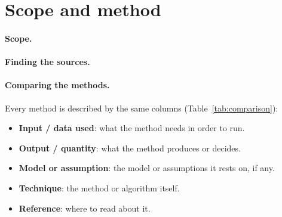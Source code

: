 \section{Scope and method}
\label{sec:method}

\paragraph{Scope.}

\paragraph{Finding the sources.}

\paragraph{Comparing the methods.}
Every method is described by the same columns (Table~\ref{tab:comparison}):

\begin{itemize}
  \item \textbf{Input / data used}: what the method needs in order to run.
  \item \textbf{Output / quantity}: what the method produces or decides.
  \item \textbf{Model or assumption}: the model or assumptions it rests on, if any.
  \item \textbf{Technique}: the method or algorithm itself.
  \item \textbf{Reference}: where to read about it.
\end{itemize}

\noindent {}
